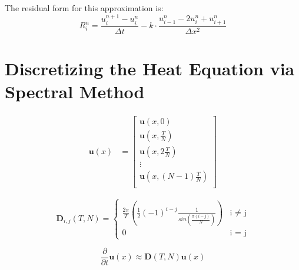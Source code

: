 \documentclass{article}
\begin{document}
The residual form for this approximation is:
\begin{equation}
R_{i}^{n} = \frac{u_i^{n+1} - u_i^{n}}{\Delta t} - k \cdot \frac{u_{i-1}^{n} - 2u_{i}^{n} + u_{i+1}^{n}}{\Delta x^2}
\label{finite_differences_residual}
\end{equation}

\section{Discretizing the Heat Equation via Spectral Method}

\begin{align}
\textbf{u}(x) &= \begin{bmatrix}
       \textbf{u}(x,0) \\
       \textbf{u}(x,\frac{T}{N}) \\
       \textbf{u}(x,2\frac{T}{N}) \\
       \vdots \\
       \textbf{u}(x,(N-1)\frac{T}{N}) \\
   \end{bmatrix}
   \end{align}

\begin{equation}
    \textbf{D}_{i,j}(T,N) = 
    \begin{cases}
        \frac{2 \pi}{T} (\frac{1}{2}(-1)^{i-j}\frac{1}{sin(\frac{\pi (i-j)}{N})}) & \text{i $\neq$ j} \\
        0 & \text{i $=$ j}
    \end{cases}
\end{equation}

\begin{equation}
    \frac{\partial}{\partial t} \textbf{u}(x) \approx \textbf{D}(T,N)\textbf{u}(x)
\end{equation}


\end{document}
